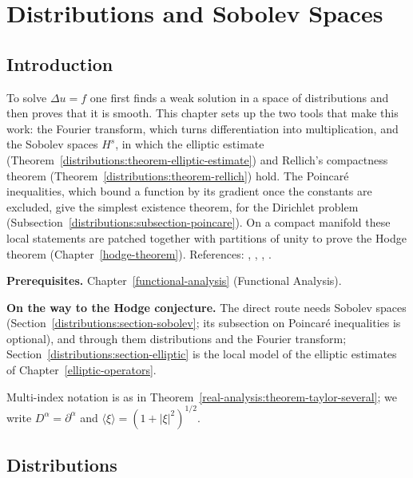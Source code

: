 \chapter{Distributions and Sobolev Spaces}\label{distributions}

\section{Introduction}\label{distributions:section-introduction}

To solve $\Delta u = f$ one first finds a weak solution in a space of distributions and then proves that it is smooth. This chapter
sets up the two tools that make this work: the Fourier transform, which turns differentiation into multiplication, and the Sobolev
spaces $H^s$, in which the elliptic estimate (Theorem~\ref{distributions:theorem-elliptic-estimate}) and Rellich's compactness
theorem (Theorem~\ref{distributions:theorem-rellich}) hold. The Poincar\'e inequalities, which bound a function by its gradient once the constants are
excluded, give the simplest existence theorem, for the Dirichlet problem (Subsection~\ref{distributions:subsection-poincare}). On a compact manifold these local statements are patched together with
partitions of unity to prove the Hodge theorem (Chapter~\ref{hodge-theorem}). References: \cite{hormander-pdo1},
\cite[Chapters 6--7]{rudin-fa}, \cite{brezis-functional}, \cite[Chapter 6]{warner-foundations}.

\noindent\textbf{Prerequisites.} Chapter~\ref{functional-analysis} (Functional Analysis).

\noindent\textbf{On the way to the Hodge conjecture.} The direct route needs Sobolev spaces (Section~\ref{distributions:section-sobolev}; its subsection on Poincar\'e inequalities is optional), and through them distributions and the Fourier transform; Section~\ref{distributions:section-elliptic} is the local
model of the elliptic estimates of Chapter~\ref{elliptic-operators}.

Multi-index notation is as in Theorem~\ref{real-analysis:theorem-taylor-several}; we write $D^\alpha = \partial^\alpha$ and $\langle \xi \rangle = (1 + |\xi|^2)^{1/2}$.

\section{Distributions}\label{distributions:section-distributions}

